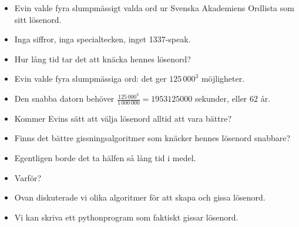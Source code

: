 \begin{frame}
  \begin{exercise}
    \begin{itemize}
      \item Evin valde fyra slumpmässigt valda ord ur Svenska Akademiens 
        Ordlista som sitt lösenord.
      \item Inga siffror, inga specialtecken, inget 1337-speak.
      \item Hur lång tid tar det att knäcka hennes lösenord?
    \end{itemize}
  \end{exercise}
\end{frame}

\begin{frame}
  \begin{solution}
    \begin{itemize}
      \item Evin valde fyra slumpmässiga ord: det ger \(125\,000^3\) 
        möjligheter.
      \item Den \alert{snabba} datorn behöver \(\frac{125\,000^3}{1\,000\,000} 
        = 1953125000\) sekunder, eller 62 år.
    \end{itemize}
  \end{solution}
\end{frame}

\begin{frame}
  \begin{question}
    \begin{itemize}
      \item Kommer Evins sätt att välja lösenord alltid att vara bättre?
      \item Finns det bättre gissningsalgoritmer som knäcker hennes lösenord 
        snabbare?
    \end{itemize}
  \end{question}
\end{frame}

\begin{frame}
  \begin{question}
    \begin{itemize}
      \item Egentligen borde det ta hälfen så lång tid i medel.
      \item Varför?
    \end{itemize}
  \end{question}
\end{frame}


\begin{frame}
  \begin{example}[Lösenord]
    \begin{itemize}
      \item Ovan diskuterade vi olika algoritmer för att skapa och gissa 
        lösenord.
      \item Vi kan skriva ett pythonprogram som faktiskt gissar lösenord.
    \end{itemize}
  \end{example}
\end{frame}



